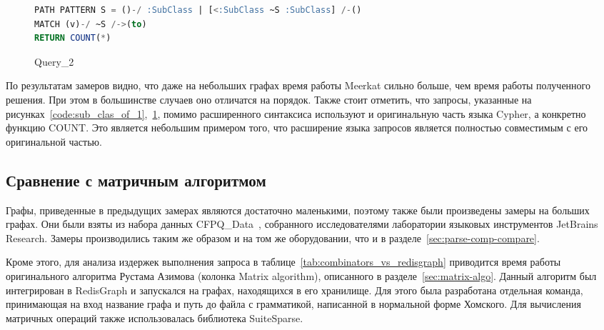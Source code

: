 \begin{figure}[h!]
\begin{adjustbox}{max width=\textwidth}
\begin{lstlisting}[language=sql]
PATH PATTERN S = ()-/ :SubClass | [<:SubClass ~S :SubClass] /-()
MATCH (v)-/ ~S /->(to)
RETURN COUNT(*)
\end{lstlisting}
\end{adjustbox}
\caption{Query\_2}
\label{code:sub_clas_of_2}
\end{figure}

По результатам замеров видно, что даже на небольших графах время работы Meerkat сильно больше, чем время работы полученного решения. При этом в большинстве случаев оно отличатся на порядок. Также стоит отметить, что запросы, указанные на рисунках~\ref{code:sub_clas_of_1},~\ref{code:sub_clas_of_2}, помимо расширенного синтаксиса используют и оригинальную часть языка Cyp\-her, а конкретно функцию COUNT. Это является небольшим примером того, что расширение языка запросов является полностью совместимым с его оригинальной частью.


\subsection{Сравнение с матричным алгоритмом}
Графы, приведенные в предыдущих замерах являются достаточно маленькими, поэтому также были произведены замеры на больших графах. Они были взяты из набора данных CFPQ\_Data~\cite{cfpq-data}, собранного исследователями лаборатории языковых инструментов JetBrains Research. Замеры производились таким же образом и на том же оборудовании, что и в разделе~\ref{sec:parse-comp-compare}.


Кроме этого, для анализа издержек выполнения запроса в таблице~\ref{tab:combinators_vs_redisgraph} приводится время работы оригинального алгоритма Рустама Азимова (колонка Matrix algorithm), описанного в разделе~\ref{sec:matrix-algo}. Данный алгоритм был интегрирован в RedisGraph и запускался на графах, находящихся в его хранилище. Для этого была разработана отдельная команда, принимающая на вход название графа и путь до файла с грамматикой, написанной в нормальной форме Хомского. Для вычисления матричных операций также использовалась библиотека SuiteSparse.

